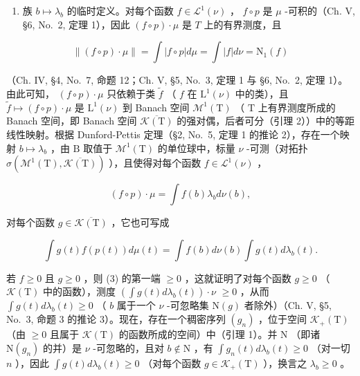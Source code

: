 \begin{enumerate}
\def\labelenumi{\arabic{enumi})}
\setcounter{enumi}{1}
\tightlist
\item
  族 \(b \mapsto \lambda_b\) 的临时定义。对每个函数 \(f \in \mathcal{L}^1(\nu)\) ， \(f \circ p\) 是 \(\mu\) -可积的（Ch. V, §6, No.~2, 定理 1），因此 \((f \circ p) \cdot \mu\) 是 \(T\) 上的有界测度，且
\end{enumerate}

\[
\left\| (f \circ p) \cdot \mu \right\| = \int | f \circ p | d \mu = \int | f | d \nu = \mathrm{N} _ {1} (f)
\]

（Ch. IV, §4, No.~7, 命题 12；Ch. V, §5, No.~3, 定理 1 与 §6, No.~2, 定理 1）。由此可知， \((f \circ p) \cdot \mu\) 只依赖于类 \(\widetilde{f}\) （ \(f\) 在 \(\mathrm{L}^1(\nu)\) 中的类），且 \(\widetilde{f} \mapsto (f \circ p) \cdot \mu\) 是 \(\mathrm{L}^1(\nu)\) 到 Banach 空间 \(\mathcal{M}^1(\mathrm{T})\) （ \(\mathrm{T}\) 上有界测度所成的 Banach 空间，即 Banach 空间 \(\overline{\mathcal{K}(\mathrm{T})}\) 的强对偶，后者可分（引理 2））中的等距线性映射。根据 Dunford-Pettis 定理（§2, No.~5, 定理 1 的推论 2），存在一个映射 \(b \mapsto \lambda_b\) ，由 \(\mathrm{B}\) 取值于 \(\mathcal{M}^1(\mathrm{T})\) 的单位球中，标量 \(\nu\) -可测（对拓扑 \(\sigma(\mathcal{M}^1(\mathrm{T}), \overline{\mathcal{K}(\mathrm{T})})\) ），且使得对每个函数 \(f \in \mathcal{L}^1(\nu)\) ，

\[
(f \circ p) \cdot \mu = \int f (b) \lambda_ {b} d \nu (b),\tag{2}
\]

对每个函数 \(g \in \overline{\mathcal{K}(\mathrm{T})}\) ，它也可写成

\[
\int g (t) f (p (t)) d \mu (t) = \int f (b) d \nu (b) \int g (t) d \lambda_ {b} (t).\tag{3}
\]

若 \(f \geqslant 0\) 且 \(g \geqslant 0\) ，则 (3) 的第一端 \(\geqslant 0\) ，这就证明了对每个函数 \(g \geqslant 0\) （ \(\mathcal{K}(\mathrm{T})\) 中的函数），测度 \(\left( \int g(t) d\lambda_b(t) \right) \cdot \nu\) \(\geqslant 0\) ，从而 \(\int g(t) d\lambda_b(t) \geqslant 0\) （ \(b\) 属于一个 \(\nu\) -可忽略集 \(\mathrm{N}(g)\) 者除外）（Ch. V, §5, No.~3, 命题 3 的推论 3）。现在，存在一个稠密序列 \((g_n)\) ，位于空间 \(\mathcal{K}_+(\mathrm{T})\) （由 \(\geqslant 0\) 且属于 \(\mathcal{K}(\mathrm{T})\) 的函数所成的空间）中（引理 1）。并 \(\mathrm{N}\) （即诸 \(\mathrm{N}(g_n)\) 的并）是 \(\nu\) -可忽略的，且对 \(b \notin \mathrm{N}\) ，有 \(\int g_n(t) d\lambda_b(t) \geqslant 0\) （对一切 \(n\) ），因此 \(\int g(t) d\lambda_b(t) \geqslant 0\) （对每个函数 \(g \in \mathcal{K}_+(\mathrm{T})\) ），换言之 \(\lambda_b \geqslant 0\) 。

